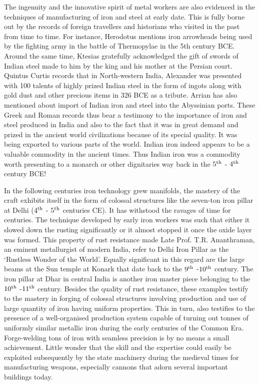 The ingenuity and the innovative spirit of metal workers are also evidenced in the techniques of manufacturing of iron and steel at early date. This is fully borne out by the records of foreign travellers and historians who visited in the past from time to time. For instance, Herodotus mentions iron arrowheads being used by the fighting army in the battle of Thermopylae in the 5th century BCE. Around the same time, Ktesias gratefully acknowledged the gift of swords of Indian steel made to him by the king and his mother at the Persian court. Quintus Curtis records that in North-western India, Alexander was presented with 100 talents of highly prized Indian steel in the form of ingots along with gold dust and other precious items in 326 BCE as a tribute. Arrian has also mentioned about import of Indian iron and steel into the Abyssinian ports. These Greek and Roman records thus bear a testimony to the importance of iron and steel produced in India and also to the fact that it was in great demand and prized in the ancient world civilizations because of its special quality. It was being exported to various parts of the world. Indian iron indeed appears to be a valuable commodity in the ancient times. Thus Indian iron was a commodity worth presenting to a monarch or other dignitaries way back in the $5^{\rm th}$ - $4^{\rm th}$ century BCE! 

In the following centuries iron technology grew manifolds, the mastery of the craft exhibits itself in the form of colossal structures like the seven-ton iron pillar at Delhi ($4^{\rm th}$ - $5^{\rm th}$ centuries CE). It has withstood the ravages of time for centuries. The technique developed by early iron workers was such that either it slowed down the rusting significantly or it almost stopped it once the oxide layer was formed. This property of rust resistance made Late Prof. T.R. Ananthraman, an eminent metallurgist of modern India, refer to Delhi Iron Pillar as the ‘Rustless Wonder of the World’. Equally significant in this regard are the large beams at the Sun temple at Konark that date back to the $9^{\rm th}$ -$10^{\rm th}$ century. The iron pillar at Dhar in central India is another iron master piece belonging to the $10^{\rm th}$ -$11^{\rm th}$ century. Besides the quality of rust resistance, these examples testify to the mastery in forging of colossal structures involving production and use of large quantity of iron having uniform properties. This in turn, also testifies to the presence of a well-organised production system capable of turning out tonnes of uniformly similar metallic iron during the early centuries of the Common Era. Forge-welding tons of iron with seamless precision is by no means a small achievement.  Little wonder that the skill and the expertise could easily be exploited subsequently by the state machinery during the medieval times for manufacturing weapons, especially cannons that adorn several important buildings today.

